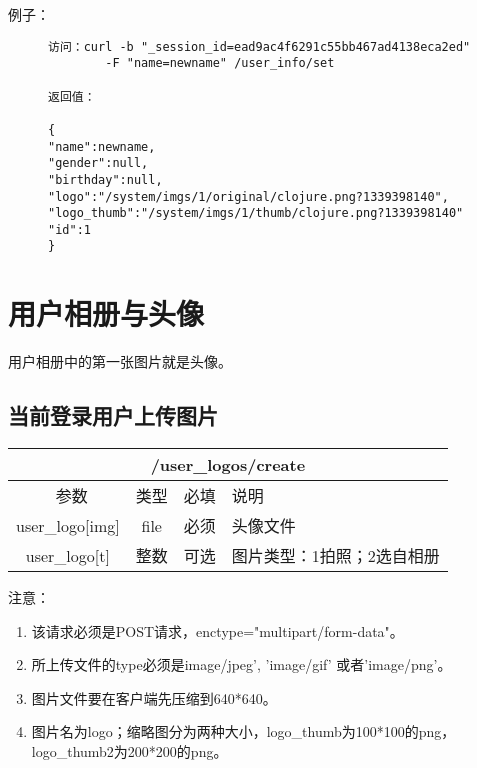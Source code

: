 \documentclass[cs4size]{ctexartutf8}
\begin{document}
例子：

\begin{figure}[H]
\begin{verbatim}
访问：curl -b "_session_id=ead9ac4f6291c55bb467ad4138eca2ed" 
        -F "name=newname" /user_info/set

返回值：

{
"name":newname,
"gender":null,
"birthday":null,
"logo":"/system/imgs/1/original/clojure.png?1339398140",
"logo_thumb":"/system/imgs/1/thumb/clojure.png?1339398140"
"id":1
}

\end{verbatim}
\end{figure}


\section{用户相册与头像}
用户相册中的第一张图片就是头像。

\subsection{当前登录用户上传图片}

\begin{table}[H]
   \begin{center}
\begin{tabular}{|c|c|c|p{12cm}|}
\hline
\multicolumn{4}{|c|}{/user\_logos/create} \\
\hline\hline
 \  参数  & 类型 & 必填 &  说明  \\
\hline
 user\_logo[img]  & file & 必须 &  头像文件\\
 \hline
 user\_logo[t]  & 整数 & 可选 &  图片类型：1拍照；2选自相册\\
\hline
\end{tabular}
   \end{center}
\end{table}

注意：

\begin{enumerate}
\item 该请求必须是POST请求，enctype="multipart/form-data"。
\item 所上传文件的type必须是image/jpeg', 'image/gif' 或者'image/png'。
\item 图片文件要在客户端先压缩到640*640。
\item 图片名为logo；缩略图分为两种大小，logo\_thumb为100*100的png，logo\_thumb2为200*200的png。
\end{enumerate}
\end{document}
